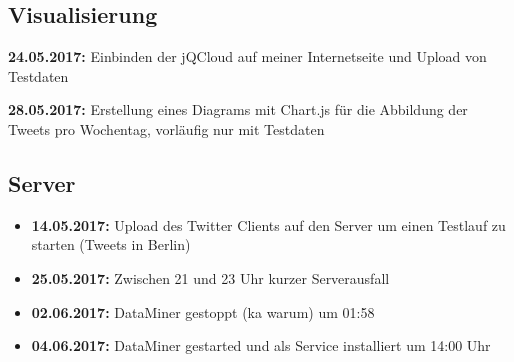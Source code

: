 \documentclass[12pt, 
	a4paper, 
	oneside, 
	leqno]{scrreprt}
\begin{document}
\subsection*{Visualisierung}
  \item \textbf{24.05.2017:} Einbinden der jQCloud auf meiner Internetseite und Upload von Testdaten
  \item \textbf{28.05.2017:} Erstellung eines Diagrams mit Chart.js für die Abbildung der Tweets pro Wochentag, vorläufig nur mit Testdaten

\subsection*{Server}

\begin{itemize}
  \item \textbf{14.05.2017:} Upload des Twitter Clients auf den Server um einen Testlauf zu starten (Tweets in Berlin)
  \item \textbf{25.05.2017:} Zwischen 21 und 23 Uhr kurzer Serverausfall
  \item \textbf{02.06.2017:} DataMiner gestoppt (ka warum) um 01:58
  \item \textbf{04.06.2017:} DataMiner gestarted und als Service installiert um 14:00 Uhr
\end{itemize}
\end{document}
